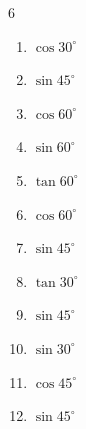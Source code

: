 \begin{multicols}{6}
\begin{enumerate}

  \item $\displaystyle \cos{30^\circ}$


  \item $\displaystyle \sin{45^\circ}$


  \item $\displaystyle \cos{60^\circ}$


  \item $\displaystyle \sin{60^\circ}$


  \item $\displaystyle \tan{60^\circ}$


  \item $\displaystyle \cos{60^\circ}$


  \item $\displaystyle \sin{45^\circ}$


  \item $\displaystyle \tan{30^\circ}$


  \item $\displaystyle \sin{45^\circ}$


\columnbreak %

\resetques

  \item $\displaystyle \sin{30^\circ}$


  \item $\displaystyle \cos{45^\circ}$


  \item $\displaystyle \sin{45^\circ}$


\end{enumerate}
\end{multicols}
